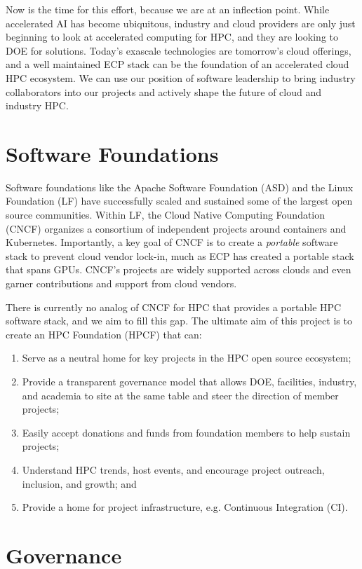\documentclass[11pt]{article}
\begin{document}
Now is the time for this effort, because we are at an inflection point. While
accelerated AI has become ubiquitous, industry and cloud providers are only just
beginning to look at accelerated computing for HPC, and they are looking to DOE for
solutions. Today's exascale technologies are tomorrow's cloud offerings, and a well
maintained ECP stack can be the foundation of an accelerated cloud HPC ecosystem. We can
use our position of software leadership to bring industry collaborators into our
projects and actively shape the future of cloud and industry HPC.

\section{Software Foundations}

Software foundations like the Apache Software Foundation (ASD) and the Linux Foundation
(LF) have successfully scaled and sustained some of the largest open source communities.
Within LF, the Cloud Native Computing Foundation (CNCF) organizes a consortium of
independent projects around containers and Kubernetes. Importantly, a key goal of CNCF
is to create a {\it portable} software stack to prevent cloud vendor lock-in, much as
ECP has created a portable stack that spans GPUs. CNCF's projects are widely supported
across clouds and even garner contributions and support from cloud vendors.

There is currently no analog of CNCF for HPC that provides a portable HPC software
stack, and we aim to fill this gap. The ultimate aim of this project is to create an HPC
Foundation (HPCF) that can:
\begin{enumerate}
\item Serve as a neutral home for key projects in the HPC open source ecosystem;
\item Provide a transparent governance model that allows DOE, facilities, industry, and
  academia to site at the same table and steer the direction of member projects;
\item Easily accept donations and funds from foundation members to help sustain projects;
\item Understand HPC trends, host events, and encourage project outreach, inclusion, and
  growth; and
\item Provide a home for project infrastructure, e.g. Continuous Integration (CI).
\end{enumerate}

\section{Governance}
\end{document}
